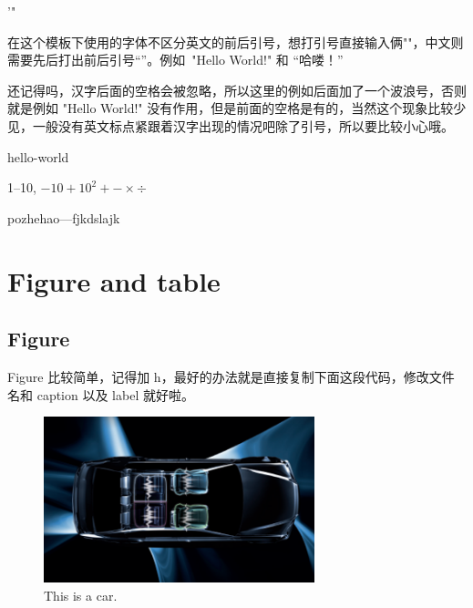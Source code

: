 '"

在这个模板下使用的字体不区分英文的前后引号，想打引号直接输入俩""，中文则需要先后打出前后引号“”。例如~"Hello World!" 和 “哈喽！”

还记得吗，汉字后面的空格会被忽略，所以这里的例如后面加了一个波浪号，否则就是例如 "Hello World!" 没有作用，但是前面的空格是有的，当然这个现象比较少见，一般没有英文标点紧跟着汉字出现的情况吧除了引号，所以要比较小心哦。

hello-world

1--10, $-10+10^2+-\times \div$

pozhehao---fjkdslajk
\section{Figure and table}

\subsection{Figure}
Figure 比较简单，记得加 h，最好的办法就是直接复制下面这段代码，修改文件名和 caption
以及 label 就好啦。
\\  %
\begin{figure}[h]
    \centering
    \includegraphics[width=0.7\textwidth]{Img/Chap1/fig1a}
    \caption[This is a car.]{This is a car.\cite{TanXueLan2019DangDaiYi}} %
    \label{fig:car}
\end{figure}

